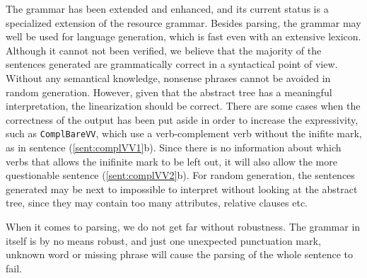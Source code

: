 \documentclass{report}
\begin{document}
The grammar has been extended and enhanced, and its current status is
a specialized extension of the resource grammar.
Besides parsing, the grammar may well be used for language generation,
which is fast even with an extensive lexicon.
Although it cannot not been verified, we believe that the majority of the
sentences generated are grammatically correct in a syntactical point of view.
Without any semantical knowledge, nonsense phrases cannot be avoided in
random generation. However, given that the abstract tree has a meaningful
interpretation,
the linearization should be correct. There are some cases when the correctness
of the output has been put aside in order to increase the expressivity, such
as \verb-ComplBareVV-, which use a verb-complement verb without the inifite mark, 
as in sentence (\ref{sent:complVV1}b).
\label{sent:complVV1}
Since there is no information about which verbs that allows the inifinite mark
to be left out, it will also allow the more questionable sentence (\ref{sent:complVV2}b).
\label{sent:complVV2}
For random generation, the sentences generated may be next to impossible
to interpret without looking at the abstract tree, since they may contain
too many attributes, relative clauses etc. 

When it comes to parsing, we do not get far without robustness.
The grammar in itself is by no means robust, and just one 
unexpected punctuation mark, unknown word
or missing phrase will cause the parsing of the whole sentence to fail. 
\end{document}
